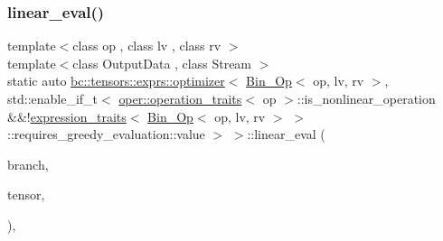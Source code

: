 \subsubsection{\texorpdfstring{linear\+\_\+eval()}{linear\_eval()}}
{\footnotesize\ttfamily template$<$class op , class lv , class rv $>$ \\
template$<$class Output\+Data , class Stream $>$ \\
static auto \hyperlink{structbc_1_1tensors_1_1exprs_1_1optimizer}{bc\+::tensors\+::exprs\+::optimizer}$<$ \hyperlink{structbc_1_1tensors_1_1exprs_1_1Bin__Op}{Bin\+\_\+\+Op}$<$ op, lv, rv $>$, std\+::enable\+\_\+if\+\_\+t$<$ \hyperlink{structbc_1_1oper_1_1operation__traits}{oper\+::operation\+\_\+traits}$<$ op $>$\+::is\+\_\+nonlinear\+\_\+operation \&\&!\hyperlink{structbc_1_1tensors_1_1exprs_1_1expression__traits}{expression\+\_\+traits}$<$ \hyperlink{structbc_1_1tensors_1_1exprs_1_1Bin__Op}{Bin\+\_\+\+Op}$<$ op, lv, rv $>$ $>$ \+::requires\+\_\+greedy\+\_\+evaluation\+::value $>$ $>$\+::linear\+\_\+eval (\begin{DoxyParamCaption}\item[{\hyperlink{structbc_1_1tensors_1_1exprs_1_1Bin__Op}{Bin\+\_\+\+Op}$<$ op, lv, rv $>$}]{branch,  }\item[{Output\+Data}]{tensor,  }\item[{\hyperlink{classbc_1_1streams_1_1Stream}{Stream}}]{ }\end{DoxyParamCaption})\hspace{0.3cm}{\ttfamily [inline]}, {\ttfamily [static]}}



